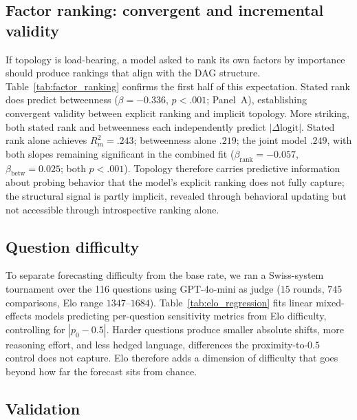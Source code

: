 \documentclass[11pt]{article}
\begin{document}
\subsection{Factor ranking: convergent and incremental validity}
\label{sec:results-ranking}

If topology is load-bearing, a model asked to rank its own factors by importance should produce rankings that align with the DAG structure. Table~\ref{tab:factor_ranking} confirms the first half of this expectation. Stated rank does predict betweenness ($\beta = -0.336$, $p < .001$; Panel~A), establishing convergent validity between explicit ranking and implicit topology. More striking, both stated rank and betweenness each independently predict $|\Delta\text{logit}|$. Stated rank alone achieves $R^2_m = .243$; betweenness alone $.219$; the joint model $.249$, with both slopes remaining significant in the combined fit ($\beta_{\text{rank}} = -0.057$, $\beta_{\text{betw}} = 0.025$; both $p < .001$). Topology therefore carries predictive information about probing behavior that the model's explicit ranking does not fully capture; the structural signal is partly implicit, revealed through behavioral updating but not accessible through introspective ranking alone.

\subsection{Question difficulty}
\label{sec:results-difficulty}

To separate forecasting difficulty from the base rate, we ran a Swiss-system tournament over the 116 questions using GPT-4o-mini as judge ($15$ rounds, $745$ comparisons, Elo range $1347$--$1684$). Table~\ref{tab:elo_regression} fits linear mixed-effects models predicting per-question sensitivity metrics from Elo difficulty, controlling for $|p_0 - 0.5|$. Harder questions produce smaller absolute shifts, more reasoning effort, and less hedged language, differences the proximity-to-$0.5$ control does not capture. Elo therefore adds a dimension of difficulty that goes beyond how far the forecast sits from chance.

\subsection{Validation}
\label{sec:results-validation}
\end{document}

